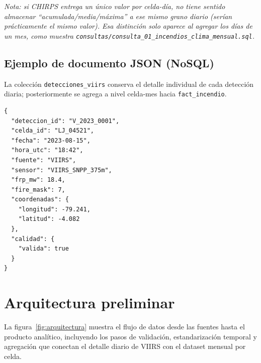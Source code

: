 \documentclass[11pt,a4paper]{article}
\begin{document}
\noindent\footnotesize\textit{Nota: si CHIRPS entrega un \'unico valor por celda-d\'ia, no tiene sentido almacenar \textquotedblleft acumulada/media/m\'axima\textquotedblright{} a ese mismo grano diario (ser\'ian pr\'acticamente el mismo valor). Esa distinci\'on solo aparece al agregar los d\'ias de un mes, como muestra \texttt{consultas/consulta\_01\_incendios\_clima\_mensual.sql}.}\normalsize

\subsection{Ejemplo de documento JSON (NoSQL)}

La colecci\'on \texttt{detecciones\_viirs} conserva el detalle individual de cada detecci\'on diaria; posteriormente se agrega a nivel celda-mes hacia \texttt{fact\_incendio}.

\begin{footnotesize}
\begin{verbatim}
{
  "deteccion_id": "V_2023_0001",
  "celda_id": "LJ_04521",
  "fecha": "2023-08-15",
  "hora_utc": "18:42",
  "fuente": "VIIRS",
  "sensor": "VIIRS_SNPP_375m",
  "frp_mw": 18.4,
  "fire_mask": 7,
  "coordenadas": {
    "longitud": -79.241,
    "latitud": -4.082
  },
  "calidad": {
    "valida": true
  }
}
\end{verbatim}
\end{footnotesize}

\section{Arquitectura preliminar}

La figura~\ref{fig:arquitectura} muestra el flujo de datos desde las fuentes hasta el producto anal\'itico, incluyendo los pasos de validaci\'on, estandarizaci\'on temporal y agregaci\'on que conectan el detalle diario de VIIRS con el dataset mensual por celda.
\end{document}
